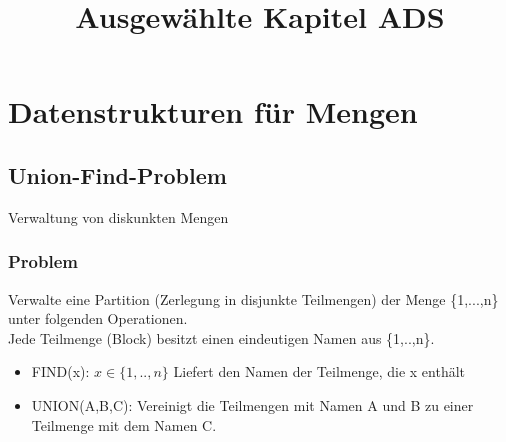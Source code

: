 \documentclass[a4paper]{article}
\begin{document}
\title{Ausgewählte Kapitel ADS}
\maketitle
\section{Datenstrukturen für Mengen}
\subsection{Union-Find-Problem}
Verwaltung von diskunkten Mengen\\
\subsubsection*{Problem}
Verwalte eine Partition (Zerlegung in disjunkte Teilmengen) der Menge \{1,...,n\} unter folgenden Operationen.\\
Jede Teilmenge (Block) besitzt einen eindeutigen Namen aus \{1,..,n\}.
\begin{itemize}
\item FIND(x): $x\in \{1,..,n\}$ Liefert den Namen der Teilmenge, die x enthält
\item UNION(A,B,C): Vereinigt die Teilmengen mit Namen A und B zu einer Teilmenge mit dem Namen C.
\end{itemize}
\end{document}
